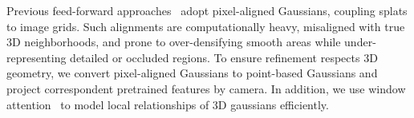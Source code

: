 

Previous feed-forward approaches~\cite{charatan2024pixelsplat,chen2024mvsplat,ye2024no}
adopt pixel-aligned Gaussians, coupling splats to image grids. Such alignments are
computationally heavy, misaligned with true 3D neighborhoods, and prone to
over-densifying smooth areas while under-representing detailed or occluded
regions. To ensure refinement respects 3D geometry, we convert pixel-aligned
Gaussians to point-based Gaussians and project correspondent pretrained features by camera. In addition, we use window attention~\cite{zhao2021point} to model local relationships of 3D gaussians efficiently.


